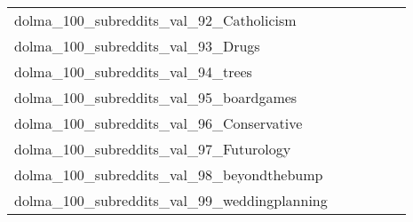 {\begin{longtable}{m{6cm}m{1.7cm}m{1.7cm}m{1.7cm}m{1.7cm}m{1.7cm}}
	dolma\_100\_subreddits\_val\_92\_Catholicism  & \colorbox[HTML]{ffffe5}{\makebox[\mywidth][c]{19.11}} & \colorbox[HTML]{dcf1a5}{\makebox[\mywidth][c]{18.22}} & \colorbox[HTML]{ffffe5}{\makebox[\mywidth][c]{19.41}} & \colorbox[HTML]{c8e89a}{\makebox[\mywidth][c]{18.17}} & \colorbox[HTML]{77c578}{\makebox[\mywidth][c]{18.03}}\\
	dolma\_100\_subreddits\_val\_93\_Drugs  & \colorbox[HTML]{ffffe5}{\makebox[\mywidth][c]{24.50}} & \colorbox[HTML]{cdeb9d}{\makebox[\mywidth][c]{23.29}} & \colorbox[HTML]{ffffe5}{\makebox[\mywidth][c]{24.74}} & \colorbox[HTML]{d8efa2}{\makebox[\mywidth][c]{23.32}} & \colorbox[HTML]{77c578}{\makebox[\mywidth][c]{23.12}}\\
	dolma\_100\_subreddits\_val\_94\_trees  & \colorbox[HTML]{ffffe5}{\makebox[\mywidth][c]{23.56}} & \colorbox[HTML]{bde395}{\makebox[\mywidth][c]{22.38}} & \colorbox[HTML]{ffffe5}{\makebox[\mywidth][c]{23.83}} & \colorbox[HTML]{ccea9c}{\makebox[\mywidth][c]{22.41}} & \colorbox[HTML]{77c578}{\makebox[\mywidth][c]{22.25}}\\
	dolma\_100\_subreddits\_val\_95\_boardgames  & \colorbox[HTML]{ffffe5}{\makebox[\mywidth][c]{22.69}} & \colorbox[HTML]{afdd8f}{\makebox[\mywidth][c]{21.48}} & \colorbox[HTML]{ffffe5}{\makebox[\mywidth][c]{23.13}} & \colorbox[HTML]{daf0a4}{\makebox[\mywidth][c]{21.61}} & \colorbox[HTML]{77c578}{\makebox[\mywidth][c]{21.38}}\\
	dolma\_100\_subreddits\_val\_96\_Conservative  & \colorbox[HTML]{ffffe5}{\makebox[\mywidth][c]{22.79}} & \colorbox[HTML]{7dc87b}{\makebox[\mywidth][c]{21.53}} & \colorbox[HTML]{ffffe5}{\makebox[\mywidth][c]{22.97}} & \colorbox[HTML]{cdeb9d}{\makebox[\mywidth][c]{21.68}} & \colorbox[HTML]{77c578}{\makebox[\mywidth][c]{21.53}}\\
	dolma\_100\_subreddits\_val\_97\_Futurology  & \colorbox[HTML]{ffffe5}{\makebox[\mywidth][c]{23.55}} & \colorbox[HTML]{d5eea1}{\makebox[\mywidth][c]{22.36}} & \colorbox[HTML]{ffffe5}{\makebox[\mywidth][c]{23.77}} & \colorbox[HTML]{d8efa2}{\makebox[\mywidth][c]{22.37}} & \colorbox[HTML]{77c578}{\makebox[\mywidth][c]{22.17}}\\
	dolma\_100\_subreddits\_val\_98\_beyondthebump  & \colorbox[HTML]{ffffe5}{\makebox[\mywidth][c]{21.07}} & \colorbox[HTML]{a4d98a}{\makebox[\mywidth][c]{19.89}} & \colorbox[HTML]{ffffe5}{\makebox[\mywidth][c]{21.22}} & \colorbox[HTML]{e9f6af}{\makebox[\mywidth][c]{20.08}} & \colorbox[HTML]{77c578}{\makebox[\mywidth][c]{19.83}}\\
	dolma\_100\_subreddits\_val\_99\_weddingplanning  & \colorbox[HTML]{ffffe5}{\makebox[\mywidth][c]{20.11}} & \colorbox[HTML]{98d485}{\makebox[\mywidth][c]{19.01}} & \colorbox[HTML]{ffffe5}{\makebox[\mywidth][c]{20.33}} & \colorbox[HTML]{e5f4ab}{\makebox[\mywidth][c]{19.19}} & \colorbox[HTML]{77c578}{\makebox[\mywidth][c]{18.96}}\\

\end{longtable}}
